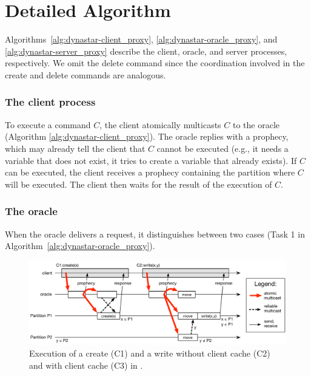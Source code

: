 \section{Detailed Algorithm}
\label{sec:dynastar-algo}

\label{sec:dynastar-detailed}


Algorithms~\ref{alg:dynastar-client_proxy}, \ref{alg:dynastar-oracle_proxy}, and
\ref{alg:dynastar-server_proxy} describe the client, oracle, and server processes,
respectively. We omit the delete command since the coordination involved in the
create and delete commands are analogous.

\subsubsection{The client process}

To execute a command $C$, the client atomically multicasts $C$ to the oracle
(Algorithm \ref{alg:dynastar-client_proxy}). The oracle replies with a prophecy,
which may already tell the client that $C$ cannot be executed (e.g., it needs a
variable that does not exist, it tries to create a variable that already
exists). If $C$ can be executed, the client receives a prophecy containing the
partition where $C$ will be executed. The client then waits for the result of
the execution of $C$.

\subsubsection{The oracle}

When the oracle delivers a request, it distinguishes between two cases (Task 1
in Algorithm~\ref{alg:dynastar-oracle_proxy}).


\begin{figure}[htp!]
\begin{minipage}[b]{1\linewidth}
\centering
      \includegraphics[width=\linewidth]{figures/dynastar}
\end{minipage}
\caption{Execution of a create (C1) and a write without client cache (C2) and with client cache (C3) in \dynastar.}
\label{fig:oracle_repartition}
\end{figure}

